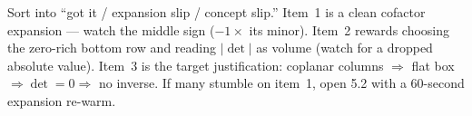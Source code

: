 \documentclass[10pt]{article}
\begin{document}
\begin{teachernote}
Sort into ``got it / expansion slip / concept slip.'' Item~1 is a clean cofactor expansion --- watch
the middle sign ($-1\times$ its minor). Item~2 rewards choosing the zero-rich bottom row and reading
$|\det|$ as volume (watch for a dropped absolute value). Item~3 is the target justification: coplanar
columns $\Rightarrow$ flat box $\Rightarrow\det=0\Rightarrow$ no inverse. If many stumble on item~1,
open 5.2 with a 60-second expansion re-warm.
\end{teachernote}
\end{document}

